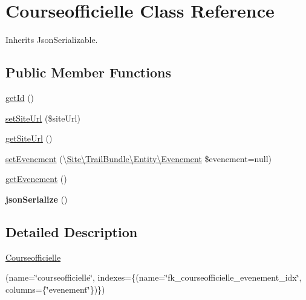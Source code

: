 \hypertarget{class_site_1_1_trail_bundle_1_1_entity_1_1_courseofficielle}{}\section{Courseofficielle Class Reference}
\label{class_site_1_1_trail_bundle_1_1_entity_1_1_courseofficielle}


Inherits Json\+Serializable.

\subsection*{Public Member Functions}
\begin{DoxyCompactItemize}
\item 
\hyperlink{class_site_1_1_trail_bundle_1_1_entity_1_1_courseofficielle_a12251d0c022e9e21c137a105ff683f13}{get\+Id} ()
\item 
\hyperlink{class_site_1_1_trail_bundle_1_1_entity_1_1_courseofficielle_ad7e743f9f27be589b787b331b36ba549}{set\+Site\+Url} (\$site\+Url)
\item 
\hyperlink{class_site_1_1_trail_bundle_1_1_entity_1_1_courseofficielle_a2d80ea9652d1586d5dcd03d022150f73}{get\+Site\+Url} ()
\item 
\hyperlink{class_site_1_1_trail_bundle_1_1_entity_1_1_courseofficielle_a6ed044dcb38f66a09b105075b59bd8ed}{set\+Evenement} (\textbackslash{}\hyperlink{class_site_1_1_trail_bundle_1_1_entity_1_1_evenement}{Site\textbackslash{}\+Trail\+Bundle\textbackslash{}\+Entity\textbackslash{}\+Evenement} \$evenement=null)
\item 
\hyperlink{class_site_1_1_trail_bundle_1_1_entity_1_1_courseofficielle_a0d200fcb8e70d13b45e20baf2269ed3f}{get\+Evenement} ()
\item 
\hypertarget{class_site_1_1_trail_bundle_1_1_entity_1_1_courseofficielle_ad402d8679325bc514874370f02b5c2ac}{}{\bfseries json\+Serialize} ()\label{class_site_1_1_trail_bundle_1_1_entity_1_1_courseofficielle_ad402d8679325bc514874370f02b5c2ac}

\end{DoxyCompactItemize}


\subsection{Detailed Description}
\hyperlink{class_site_1_1_trail_bundle_1_1_entity_1_1_courseofficielle}{Courseofficielle}

(name=\char`\"{}courseofficielle\char`\"{}, indexes=\{(name=\char`\"{}fk\+\_\+courseofficielle\+\_\+evenement\+\_\+idx\char`\"{}, columns=\{\char`\"{}evenement\char`\"{}\})\})  

